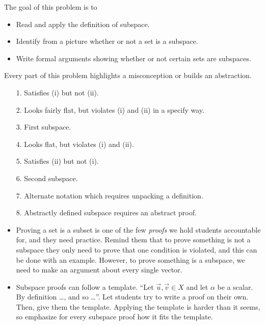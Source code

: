 	\question
	\begin{annotation}
		\begin{goals}

			The goal of this problem is to
			\begin{itemize}
				\item Read and apply the definition of subspace.
				\item Identify from a picture whether or not a set is a subspace.
				\item Write formal arguments showing whether or not certain sets are subspaces.
			\end{itemize}
		\end{goals}

		\begin{notes}
			Every part of this problem highlights a misconception or builds an abstraction.
			\begin{enumerate}
				\item[1.] Satisfies (i) but not (ii).
				\item[2.] Looks fairly flat, but violates (i) and (ii) in a specify way.
				\item[3.] First subspace.
				\item[4.] Looks flat, but violates (i) and (ii).
				\item[5.] Satisfies (ii) but not (i).
				\item[6.] Second subspace.
				\item[7.] Alternate notation which requires unpacking a definition.
				\item[8.] Abstractly defined subspace requires an abstract proof.
			\end{enumerate}
			\begin{itemize}
				\item Proving a set is a subset is one of the few \emph{proofs} we hold
					students accountable for, and they need practice. Remind them
					that to prove something is not a subspace they only need to
					prove that one condition is violated, and this can be done with
					an example. However, to prove something is a subspace, we need
					to make an argument about every single vector.
				\item Subspace proofs can follow a template. ``Let $\vec u,\vec v\in X$ and
					let $\alpha$ be a scalar. By definition \ldots, and so \ldots''. Let
					students try to write a proof on their own. Then, give them
					the template. Applying the template is harder than it seems, so
					emphasize for every subspace proof how it fits the template.
			\end{itemize}
		\end{notes}
	\end{annotation}
